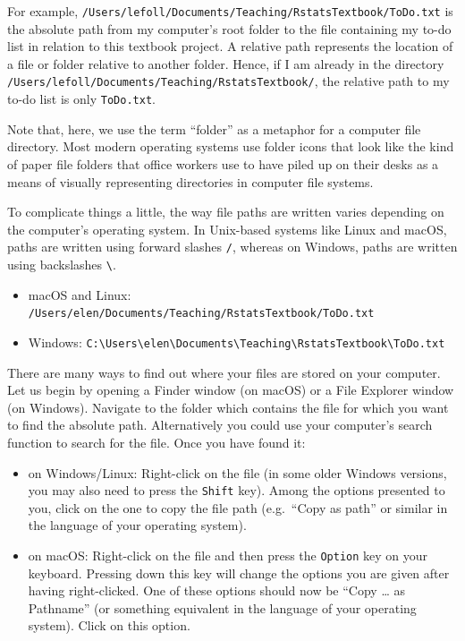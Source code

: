 \documentclass[
  letterpaper,
  DIV=11,
  numbers=noendperiod]{scrreprt}
\providecommand{\tightlist}{%
  \setlength{\itemsep}{0pt}\setlength{\parskip}{0pt}}
\begin{document}
For example,
\texttt{/Users/lefoll/Documents/Teaching/RstatsTextbook/ToDo.txt} is the
absolute path from my computer's root folder to the file containing my
to-do list in relation to this textbook project. A relative path
represents the location of a file or folder relative to another folder.
Hence, if I am already in the directory
\texttt{/Users/lefoll/Documents/Teaching/RstatsTextbook/}, the relative
path to my to-do list is only \texttt{ToDo.txt}.

Note that, here, we use the term ``folder'' as a metaphor for a computer
file directory. Most modern operating systems use folder icons that look
like the kind of paper file folders that office workers use to have
piled up on their desks as a means of visually representing directories
in computer file systems.

To complicate things a little, the way file paths are written varies
depending on the computer's operating system. In Unix-based systems like
Linux and macOS, paths are written using forward slashes \texttt{/},
whereas on Windows, paths are written using backslashes
\texttt{\textbackslash{}}.

\begin{itemize}
\tightlist
\item
  macOS and Linux:
  \texttt{/Users/elen/Documents/Teaching/RstatsTextbook/ToDo.txt}
\item
  Windows:
  \texttt{C:\textbackslash{}Users\textbackslash{}elen\textbackslash{}Documents\textbackslash{}Teaching\textbackslash{}RstatsTextbook\textbackslash{}ToDo.txt}
\end{itemize}

There are many ways to find out where your files are stored on your
computer. Let us begin by opening a Finder window (on macOS) or a File
Explorer window (on Windows). Navigate to the folder which contains the
file for which you want to find the absolute path. Alternatively you
could use your computer's search function to search for the file. Once
you have found it:

\begin{itemize}
\item
  on Windows/Linux: Right-click on the file (in some older Windows
  versions, you may also need to press the \texttt{Shift} key). Among
  the options presented to you, click on the one to copy the file path
  (e.g.~``Copy as path'' or similar in the language of your operating
  system).
\item
  on macOS: Right-click on the file and then press the \texttt{Option}
  key on your keyboard. Pressing down this key will change the options
  you are given after having right-clicked. One of these options should
  now be ``Copy \ldots{} as Pathname'' (or something equivalent in the
  language of your operating system). Click on this option.
\end{itemize}
\end{document}
